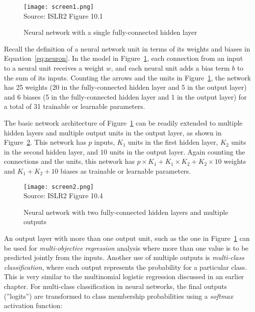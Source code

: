 \begin{figure}
\centering
\texttt{[image: screen1.png]} \\

\scriptsize Source: ISLR2 Figure 10.1
\caption{Neural network with a single fully-connected hidden layer}
\label{fig:screen1_chap15}
\end{figure}

Recall the definition of a neural network unit in terms of its weights and biases in Equation~\ref{eq:neuron}. In the model in Figure~\ref{fig:screen1_chap15}, each connection from an input to a neural unit receives a weight $w$, and each neural unit adds a bias term $b$ to the sum of its inputs. Counting the arrows and the units in Figure~\ref{fig:screen1_chap15}, the network has 25 weights (20 in the fully-connected hidden layer and 5 in the output layer) and 6 biases (5 in the fully-connected hidden layer and 1 in the output layer) for a total of 31 trainable or learnable parameters.

The basic network architecture of Figure~\ref{fig:screen1_chap15} can be readily extended to multiple hidden layers and multiple output units in the output layer, as shown in Figure~\ref{fig:screen2_chap15}. This network has $p$ inputs, $K_1$ units in the first hidden layer, $K_2$ units in the second hidden layer, and 10 units in the output layer. Again counting the connections and the units, this network has $p \times K_1 + K_1 \times K_2 + K_2 \times 10$ weights and $K_1 + K_2 + 10$ biases as trainable or learnable parameters. 


\begin{figure}
\centering
\texttt{[image: screen2.png]} \\

\scriptsize Source: ISLR2 Figure 10.4
\caption{Neural network with two fully-connected hidden layers and multiple outputs}
\label{fig:screen2_chap15}
\end{figure}

An output layer with more than one output unit, such as the one in Figure~\ref{fig:screen1_chap15} can be used for \emph{multi-objective regression} analysis where more than one value is to be predicted jointly from the inputs. Another use of multiple outputs is \emph{multi-class classification}, where each output represents the probability for a particular class. This is very similar to the multinomial logistic regression discussed in an earlier chapter. For multi-class classification in neural networks, the final outputs (''logits'') are transformed to class membership probabilities using a \emph{softmax} activation function:

